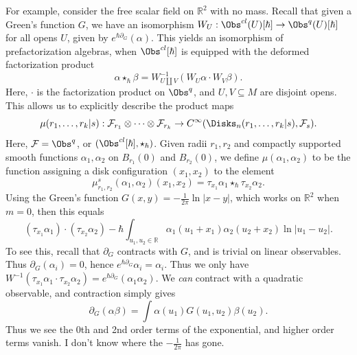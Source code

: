 For example, consider the free scalar field on $\mathbb{R} ^2$ with no mass. Recall that given a Green's function $G$, we have an isomorphism $W_U : \Obs^{cl} (U)[\hbar ] \to \Obs^{q} (U)[\hbar ]$ for all opens $U$, given by $e^{\hbar \partial _G} (\alpha )$. This yields an isomorphism of prefactorization algebras, when $\Obs^{cl} [\hbar ]$ is equipped with the deformed factorization product
\[
	\alpha \star _{\hbar } \beta =W^{-1}_{U \amalg V} (W_U\alpha \cdot W_V\beta )
.\]
Here, $\cdot $ is the factorization product on $\Obs^{q} $, and $U,V\subseteq M$ are disjoint opens. This allows us to explicitly describe the product maps
\[
	\mu (r_1, \ldots , r_k | s): \mathcal{F} _{r_1} \otimes \cdots \otimes \mathcal{F} _{r_k}  \to C^\infty(\Disks_n(r_1, \ldots , r_k | s), \mathcal{F} _{s} ) 
.\]
Here, $\mathcal{F} =\Obs^{q} $, or $(\Obs^{cl} [\hbar ],\star _{\hbar } )$. Given radii $r_1,r_2$ and compactly supported smooth functions $\alpha _1,\alpha _2$ on $B_{r_1} (0)$ and $B_{r_2} (0)$, we define $\mu (\alpha _1,\alpha _2)$ to be the function assigning a disk configuration $(x_1,x_2)$ to the element
\[
	\mu _{r_1,r_2} ^s(\alpha _1,\alpha _2)(x_1,x_2) = \tau _{x_1} \alpha _1 \star _{\hbar } \tau _{x_2} \alpha _2
.\]
Using the Green's function $G(x,y) = -\frac{1}{2\pi } \ln \left| x-y \right| $, which works on $\mathbb{R} ^2$ when $m=0$, then this equals
\[
	(\tau _{x_1} \alpha _1)\cdot (\tau _{x_2} \alpha _2)-\hbar \int_{u_1,u_2\in\mathbb{R} } \alpha _1(u_1+x_1)\alpha _2(u_2+x_2)\ln \left| u_1-u_2 \right| 
.\]
To see this, recall that $\partial _G$ contracts with $G$, and is trivial on linear observables. Thus $\partial _G(\alpha _i) = 0$, hence $e^{\hbar \partial _G} \alpha _i = \alpha _i$. Thus we only have $W^{-1} (\tau _{x_1} \alpha _1\cdot \tau _{x_2}\alpha _2) = e^{\hbar \partial _G} (\alpha _1\alpha _2)$. We \emph{can} contract with a quadratic observable, and contraction simply gives
\[
	\partial _G(\alpha \beta ) = \int \alpha(u_1)G(u_1,u_2)\beta (u_2)
.\]
Thus we see the 0th and 2nd order terms of the exponential, and higher order terms vanish. I don't know where the $-\frac{1}{2\pi } $ has gone.
